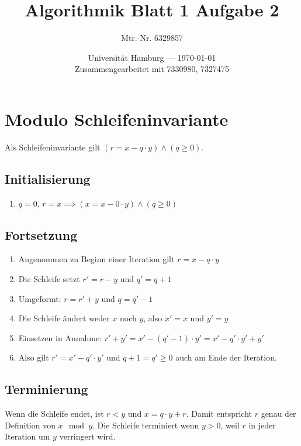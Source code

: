 \documentclass[parskip=half,a4paper]{scrartcl}
\title{Algorithmik Blatt 1 Aufgabe 2}
\author{Mtr.-Nr. 6329857}
\date{Universität Hamburg --- \today \\ Zusammengearbeitet mit 7330980, 7327475}
\begin{document}
\maketitle

\section*{Modulo Schleifeninvariante}

Als Schleifeninvariante gilt $\left(r = x - q \cdot y\right) \land \left(q \ge 0\right)$.

\subsection*{Initialisierung}

\begin{enumerate}
	\item $q = 0$, $r = x \implies \left(x = x - 0 \cdot y\right) \land \left(q \ge 0\right)$
\end{enumerate}

\subsection*{Fortsetzung}

\begin{enumerate}
	\item Angenommen zu Beginn einer Iteration gilt $r = x - q \cdot y$
	\item Die Schleife setzt $r' = r - y$ und $q' = q + 1$
	\item Umgeformt: $r = r' + y$ und $q = q' - 1$
	\item Die Schleife ändert weder $x$ noch $y$, also $x' = x$ und $y' = y$
	\item Einsetzen in Annahme: $r' + y' = x' - \left(q' - 1\right) \cdot y' = x' - q' \cdot y' + y'$
	\item Also gilt $r' = x' - q' \cdot y'$ und $q + 1 = q' \ge 0$ auch am Ende der Iteration.
\end{enumerate}

\subsection*{Terminierung}

Wenn die Schleife endet, ist $r < y$ und $x = q \cdot y + r$. Damit entspricht $r$ genau der Definition von $x \mod y$. Die Schleife terminiert wenn $y > 0$, weil $r$ in jeder Iteration um $y$ verringert wird.
\end{document}
